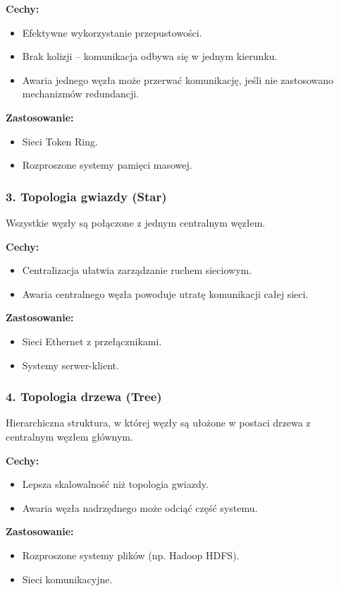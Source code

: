\textbf{Cechy:}
\begin{itemize}
    \item Efektywne wykorzystanie przepustowości.
    \item Brak kolizji – komunikacja odbywa się w jednym kierunku.
    \item Awaria jednego węzła może przerwać komunikację, jeśli nie zastosowano mechanizmów redundancji.
\end{itemize}

\textbf{Zastosowanie:}
\begin{itemize}
    \item Sieci Token Ring.
    \item Rozproszone systemy pamięci masowej.
\end{itemize}

\subsubsection{3. Topologia gwiazdy (Star)}
Wszystkie węzły są połączone z jednym centralnym węzłem.

\textbf{Cechy:}
\begin{itemize}
    \item Centralizacja ułatwia zarządzanie ruchem sieciowym.
    \item Awaria centralnego węzła powoduje utratę komunikacji całej sieci.
\end{itemize}

\textbf{Zastosowanie:}
\begin{itemize}
    \item Sieci Ethernet z przełącznikami.
    \item Systemy serwer-klient.
\end{itemize}

\subsubsection{4. Topologia drzewa (Tree)}
Hierarchiczna struktura, w której węzły są ułożone w postaci drzewa z centralnym węzłem głównym.

\textbf{Cechy:}
\begin{itemize}
    \item Lepsza skalowalność niż topologia gwiazdy.
    \item Awaria węzła nadrzędnego może odciąć część systemu.
\end{itemize}

\textbf{Zastosowanie:}
\begin{itemize}
    \item Rozproszone systemy plików (np. Hadoop HDFS).
    \item Sieci komunikacyjne.
\end{itemize}

